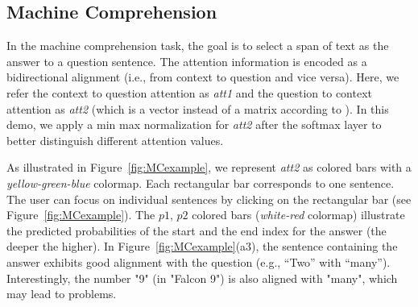 \subsection{Machine Comprehension}
\label{sec:MCexample}
In the machine comprehension task, the goal is to select a span of text as the answer
to a question sentence.
The attention information is encoded as a bidirectional alignment (i.e., from context to question and vice versa). 
Here, we refer the context to question attention as \emph{att1} and the question to context attention as \emph{att2} (which is a vector instead of a matrix according to \citet{Seo2016}). In this demo, we apply a min max normalization for \emph{att2} after the softmax layer to better distinguish different attention values.

As illustrated in Figure~\ref{fig:MCexample}, we represent \emph{att2} as colored bars with a \emph{yellow-green-blue} colormap. Each rectangular bar corresponds to one sentence. The user can focus on individual sentences by clicking on the rectangular bar (see Figure~\ref{fig:MCexample}).
The $p1$, $p2$ colored bars (\emph{white-red} colormap) illustrate the predicted probabilities of the start and the end index for the answer (the deeper the higher). %
%
In Figure~\ref{fig:MCexample}(a3), the sentence containing the answer exhibits good alignment with the question (e.g., ``Two'' with ``many'').
Interestingly, the number "9" (in "Falcon 9") is also aligned with "many", which may lead to problems.

